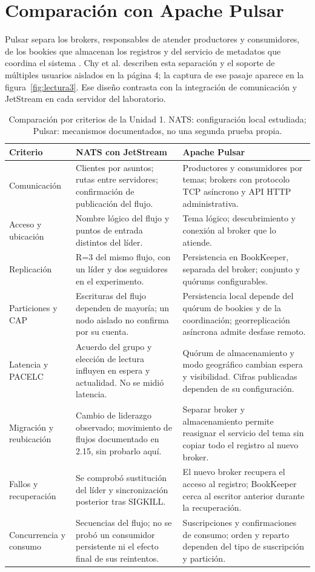 \documentclass[11pt,a4paper]{article}
\begin{document}
\section{Comparación con Apache Pulsar}
Pulsar separa los brokers, responsables de atender productores y consumidores, de los bookies que almacenan los registros y del servicio de metadatos que coordina el sistema \cite{pulsarArquitectura}. Chy et al. describen esta separación y el soporte de múltiples usuarios aislados en la página 4; la captura de ese pasaje aparece en la figura~\ref{fig:lectura3}. Ese diseño contrasta con la integración de comunicación y JetStream en cada servidor del laboratorio.

\begin{table}[H]
\small
\caption{Comparación por criterios de la Unidad 1. NATS: configuración local estudiada; Pulsar: mecanismos documentados, no una segunda prueba propia.}
\label{tab:comparacion}
\begin{tabularx}{\linewidth}{@{}p{2.5cm}YY@{}}
\toprule
\textbf{Criterio} & \textbf{NATS con JetStream} & \textbf{Apache Pulsar}\\
\midrule
Comunicación & Clientes por asuntos; rutas entre servidores; confirmación de publicación del flujo. & Productores y consumidores por temas; brokers con protocolo TCP asíncrono y API HTTP administrativa.\\
Acceso y ubicación & Nombre lógico del flujo y puntos de entrada distintos del líder. & Tema lógico; descubrimiento y conexión al broker que lo atiende.\\
Replicación & R=3 del mismo flujo, con un líder y dos seguidores en el experimento. & Persistencia en BookKeeper, separada del broker; conjunto y quórums configurables.\\
Particiones y CAP & Escrituras del flujo dependen de mayoría; un nodo aislado no confirma por su cuenta. & Persistencia local depende del quórum de bookies y de la coordinación; georreplicación asíncrona admite desfase remoto.\\
Latencia y PACELC & Acuerdo del grupo y elección de lectura influyen en espera y actualidad. No se midió latencia. & Quórum de almacenamiento y modo geográfico cambian espera y visibilidad. Cifras publicadas dependen de su configuración.\\
Migración y reubicación & Cambio de liderazgo observado; movimiento de flujos documentado en 2.15, sin probarlo aquí. & Separar broker y almacenamiento permite reasignar el servicio del tema sin copiar todo el registro al nuevo broker.\\
Fallos y recuperación & Se comprobó sustitución del líder y sincronización posterior tras SIGKILL. & El nuevo broker recupera el acceso al registro; BookKeeper cerca al escritor anterior durante la recuperación.\\
Concurrencia y consumo & Secuencias del flujo; no se probó un consumidor persistente ni el efecto final de sus reintentos. & Suscripciones y confirmaciones de consumo; orden y reparto dependen del tipo de suscripción y partición.\\
\bottomrule
\end{tabularx}
\end{table}
\end{document}
